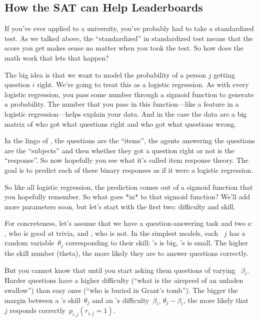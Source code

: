 \subsection{How the SAT can Help Leaderboards}

If you’ve ever applied to a university, you’ve probably had to take a
standardized test.  As we talked above, the ``standardized'' in standardized
test means that the score you get makes sense no matter when you took the
test.  So how does the math work that lets that happen?

The big idea is that we want to model the probability of a person $j$ getting
question $i$ right.  We’re going to treat this as a logistic regression.  As
with every logistic regression, you pass some number through a sigmoid
function to generate a probability.  The number that you pass in this
function—like a feature in a logistic regression—helps explain your data. And
in the case the data are a big matrix of who got what questions right and who
got what questions wrong.

In the lingo of , the questions are the ``items'', the agents answering
the questions are the ``subjects'' and then whether they got a question right or
not is the ``response''.  So now hopefully you see what it’s called item
response theory.  The goal is to predict each of these binary responses as if
it were a logistic regression.

So like all logistic regression, the prediction comes out of a sigmoid
function that you hopefully remember.  So what goes *in* to that sigmoid
function?  We’ll add more parameters soon, but let’s start with the first two:
difficulty and skill.

For concreteness, let's assume that we have a question-answering task and two \subj{}s: \smart{},
who is good at trivia, and \dumb{}, who is not.
In the simplest \irt{} models, each \subj{}~$j$ has a random
variable~$\theta_j$ corresponding to their skill: \smart{}'s is big,
\dumb{}'s is small.  The higher the skill number
(theta), the more likely they are to answer questions correctly.

But you cannot know that until you start asking them questions of
varying ~$\beta_i$.
Harder questions have a higher difficulty (``what is the airspeed of
an unladen swallow'') than easy ones (``who is buried in Grant's
tomb'').
The bigger the margin between a \subj{}'s skill~$\theta_j$ and an \itm{}'s
difficulty~$\beta_i$, $\theta_j-\beta_i$, the more likely that \subj{}~$j$
responds correctly~$p_{i,j}(r_{i,j}=1)$.


